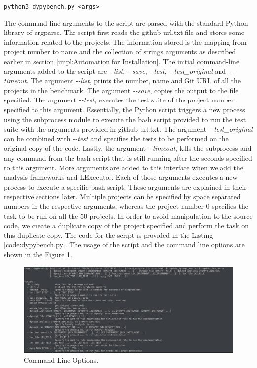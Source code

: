 \verb$python3 dypybench.py <args>$

The command-line arguments to the script are parsed with the standard Python library of argparse.
The script first reads the github-url.txt file and stores some information related to the projects.
The information stored is the mapping from project number to name and the collection of strings arguments as described earlier in section \ref{impl:Automation for Installation}.
The initial command-line arguments added to the script are \textit{\--\--list}, \textit{\--\--save}, \textit{\--\--test}, \textit{\--\--test\_original} and \textit{\--\--timeout}.
The argument \textit{\--\--list}, prints the number, name and Git URL of all the projects in the benchmark.
The argument \textit{\--\--save}, copies the output to the file specified.
The argument \textit{\--\--test}, executes the test suite of the project number specified to this argument.
Essentially, the Python script triggers a new process using the subprocess module to execute the bash script provided to run the test suite with the arguments provided in github-url.txt.
The argument \textit{\--\--test\_original} can be combined with \textit{\--\--test} and specifies the tests to be performed on the original copy of the code.  
Lastly, the argument \textit{\--\--timeout}, kills the subprocess and any command from the bash script that is still running after the seconds specified to this argument.  
More arguments are added to this interface when we add the analysis frameworks and LExecutor.
Each of those arguments executes a new process to execute a specific bash script.
These arguments are explained in their respective sections later.
Multiple projects can be specified by space separated numbers in the respective arguments, whereas the project number 0 specifies the task to be run on all the 50 projects.  
In order to avoid manipulation to the source code, we create a duplicate copy of the project specified and perform the task on this duplicate copy. 
The code for the script is provided in the Listing \ref{code:dypybench.py}.
The usage of the script and the command line options are shown in the Figure \ref{fig:command-line-options}.
\begin{figure}[ht]
    \centering
    \includegraphics[width=1\linewidth]{figures/implementation/command-line-options.png}
    \caption[Command Line Options]{\label{fig:command-line-options}Command Line Options.}
\end{figure}

